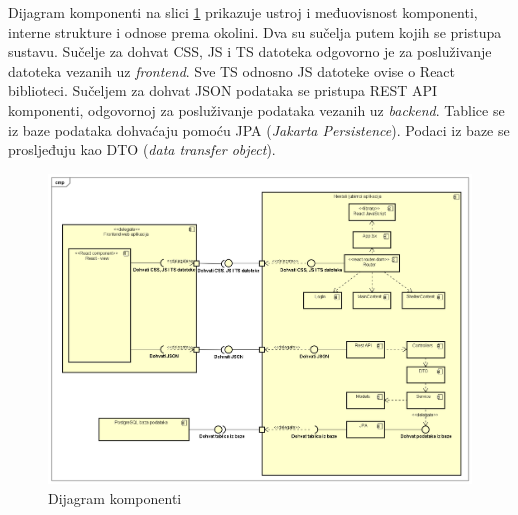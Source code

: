 			Dijagram komponenti na slici \ref{dijagram_komponenti} prikazuje ustroj i međuovisnost komponenti, interne strukture i odnose prema okolini. Dva su sučelja putem kojih se pristupa sustavu. Sučelje za dohvat CSS, JS i TS datoteka odgovorno je za posluživanje datoteka vezanih uz \textit{frontend}. Sve TS odnosno JS datoteke ovise o React biblioteci. Sučeljem za dohvat JSON podataka se pristupa REST API komponenti, odgovornoj za posluživanje podataka vezanih uz \textit{backend}. Tablice se iz baze podataka dohvaćaju pomoću JPA (\textit{Jakarta Persistence}). Podaci iz baze se prosljeđuju kao DTO (\textit{data transfer object}).
			 
			 \begin{figure}[H]
				\includegraphics[scale=0.4]{slike/dijagram_komponenti.PNG} 
				\centering
				\caption{Dijagram komponenti}
				\label{dijagram_komponenti}
			\end{figure}